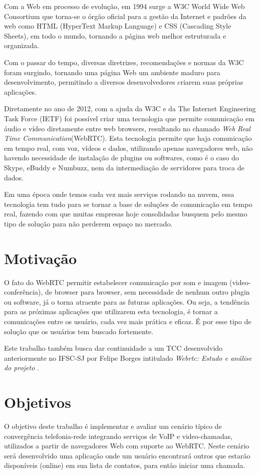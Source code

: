 \documentclass[12pt,a4paper,oneside]{report}
\begin{document}
Com a Web em processo de evolução, em 1994 surge a W3C World Wide Web Consortium  que torna-se o órgão oficial para a gestão da Internet e padrões da web como HTML (HyperText Markup Language) e CSS (Cascading Style Sheets), em todo o mundo, tornando a página web melhor estruturada e organizada.

Com o passar do tempo, diversas diretrizes, recomendações e normas da W3C foram surgindo, tornando uma página Web um ambiente maduro para desenvolvimento, permitindo a diversos desenvolvedores criarem suas próprias aplicações. 

Diretamente no ano de 2012, com a ajuda da W3C e da The Internet Engineering Task Force (IETF)  foi possível criar uma tecnologia que permite comunicação em áudio e vídeo diretamente entre web browsers, resultando no chamado \textit{Web Real Time Communication}(WebRTC). Esta tecnologia permite que haja comunicação em tempo real, com voz, vídeos e dados, utilizando apenas navegadores web, não havendo necessidade de instalação de plugins ou softwares, como é o caso do Skype, eBuddy e Numbuzz, nem da intermediação de servidores para troca de dados.
	
Em uma época onde temos cada vez mais serviços rodando na nuvem, essa tecnologia tem tudo para se tornar a base de soluções de comunicação em tempo real, fazendo com que muitas empresas hoje consolidadas busquem pelo mesmo tipo de solução para não perderem espaço no mercado.

\section{Motivação}
\label{s_motivacao} %
O fato do WebRTC permitir estabelecer comunicação por som e imagem (video-conferência), de browser para browser, sem necessidade de nenhum outro plugin ou software, já o torna atraente para as futuras aplicações. Ou seja, a tendência para as próximas aplicações que utilizarem esta tecnologia, é tornar a comunicações entre os usuário, cada vez mais prática e eficaz. É por esse tipo de solução que os usuários tem buscado fortemente. 

Este trabalho também busca dar continuidade a um TCC desenvolvido anteriormente no IFSC-SJ por Felipe Borges intitulado \textit{Webrtc: Estudo e análise do projeto} \cite{Borges:2013}.


\section{Objetivos}
\label{s_objetivos} %
O objetivo deste trabalho é implementar e avaliar um cenário típico de convergência telefonia-rede integrando serviços de VoIP e video-chamadas, utilizados a partir de navegadores Web  com suporte ao WebRTC. Neste cenário será desenvolvido uma aplicação onde um usuário encontrará outros que estarão disponíveis (online) em sua lista de contatos, para então iniciar uma chamada. 
\end{document}
